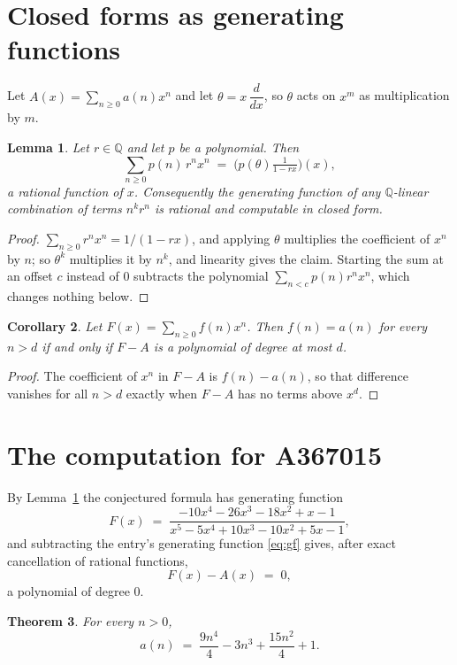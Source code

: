 \documentclass[11pt,a4paper]{article}
\theoremstyle{plain}
\newtheorem{theorem}{Theorem}
\newtheorem{lemma}[theorem]{Lemma}
\newtheorem{corollary}[theorem]{Corollary}
\theoremstyle{definition}
\begin{document}
\section{Closed forms as generating functions}

Let $A(x)=\sum_{n\ge 0}a(n)x^{n}$ and let $\theta=x\,\dfrac{d}{dx}$, so $\theta$
acts on $x^{m}$ as multiplication by $m$.

\begin{lemma}\label{lem:gf}
Let $r\in\mathbb{Q}$ and let $p$ be a polynomial. Then
\[
\sum_{n\ge0}p(n)\,r^{n}x^{n}\;=\;\bigl(p(\theta)\tfrac{1}{1-rx}\bigr)(x),
\]
a rational function of $x$. Consequently the generating function of any
$\mathbb{Q}$-linear combination of terms $n^{k}r^{n}$ is rational and computable in
closed form.
\end{lemma}

\begin{proof}
$\sum_{n\ge0}r^{n}x^{n}=1/(1-rx)$, and applying $\theta$ multiplies the coefficient of
$x^{n}$ by $n$; so $\theta^{k}$ multiplies it by $n^{k}$, and linearity gives the claim.
Starting the sum at an offset $c$ instead of $0$ subtracts the polynomial
$\sum_{n<c}p(n)r^{n}x^{n}$, which changes nothing below.
\end{proof}

\begin{corollary}\label{cor:criterion}
Let $F(x)=\sum_{n\ge 0}f(n)x^{n}$. Then $f(n)=a(n)$ for every $n>d$ if and only
if $F-A$ is a polynomial of degree at most $d$.
\end{corollary}

\begin{proof}
The coefficient of $x^{n}$ in $F-A$ is $f(n)-a(n)$, so that difference vanishes for all
$n>d$ exactly when $F-A$ has no terms above $x^{d}$.
\end{proof}

\section{The computation for A367015}

By Lemma~\ref{lem:gf} the conjectured formula has generating function
\[
F(x)\;=\;\frac{- 10 x^{4} - 26 x^{3} - 18 x^{2} + x - 1}{x^{5} - 5 x^{4} + 10 x^{3} - 10 x^{2} + 5 x - 1} ,
\]
and subtracting the entry's generating function \eqref{eq:gf} gives, after exact
cancellation of rational functions,
\[
F(x)-A(x)\;=\;0 ,
\]
a polynomial of degree $0$.

\begin{theorem}
For every $n>0$,
\[
a(n)\;=\;\frac{9 n^{4}}{4} - 3 n^{3} + \frac{15 n^{2}}{4} + 1 .
\]
\end{theorem}
\end{document}

